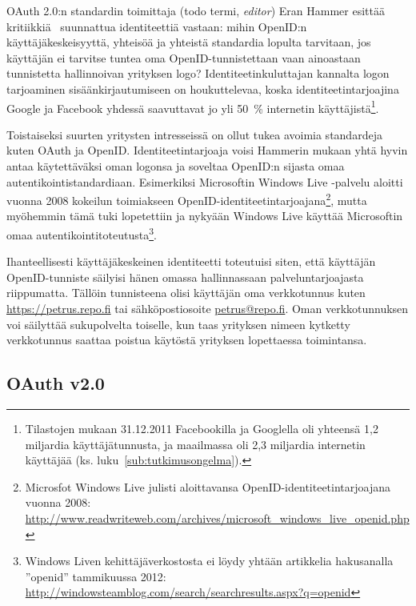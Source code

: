 \documentclass[finnish,gradu]{tktltiki}
\begin{document}
    OAuth 2.0:n standardin toimittaja (todo termi, \emph{editor}) Eran Hammer esittää kritiikkiä~\cite{hueniverse_openid_crisis} suunnattua identiteettiä vastaan: mihin OpenID:n käyttäjäkeskeisyyttä, yhteisöä ja yhteistä standardia lopulta tarvitaan, jos käyttäjän ei tarvitse tuntea oma OpenID-tunnistettaan vaan ainoastaan tunnistetta hallinnoivan yrityksen logo? Identiteetinkuluttajan kannalta logon tarjoaminen sisäänkirjautumiseen on houkuttelevaa, koska identiteetintarjoajina Google ja Facebook yhdessä saavuttavat jo yli 50~\% internetin käyttäjistä\footnote{Tilastojen mukaan 31.12.2011 Facebookilla ja Googlella oli yhteensä 1,2 miljardia käyttäjätunnusta, ja maailmassa oli 2,3 miljardia internetin käyttäjää (ks. luku~\ref{sub:tutkimusongelma}).}.

    Toistaiseksi suurten yritysten intresseissä on ollut tukea avoimia standardeja kuten OAuth ja OpenID. Identiteetintarjoaja voisi Hammerin mukaan yhtä hyvin antaa käytettäväksi oman logonsa ja soveltaa OpenID:n sijasta omaa autentikointistandardiaan. Esimerkiksi Microsoftin Windows Live -palvelu aloitti vuonna 2008  kokeilun toimiakseen OpenID-identiteetintarjoajana\footnote{Microsfot Windows Live julisti aloittavansa OpenID-identiteetintarjoajana vuonna 2008: \\ \url{http://www.readwriteweb.com/archives/microsoft_windows_live_openid.php}},
  mutta myöhemmin tämä tuki lopetettiin ja nykyään Windows Live käyttää Microsoftin omaa autentikointitoteutusta\footnote{Windows Liven kehittäjäverkostosta ei löydy yhtään artikkelia hakusanalla ''openid'' tammikuussa 2012: \url{http://windowsteamblog.com/search/searchresults.aspx?q=openid}}.

  Ihanteellisesti käyttäjäkeskeinen identiteetti toteutuisi siten, että käyttäjän OpenID-tunniste säilyisi hänen omassa hallinnassaan palveluntarjoajasta riippumatta. Tällöin tunnisteena olisi käyttäjän oma verkkotunnus kuten \url{https://petrus.repo.fi} tai sähköpostiosoite \url{petrus@repo.fi}. Oman verkkotunnuksen voi säilyttää sukupolvelta toiselle, kun taas yrityksen nimeen kytketty verkkotunnus saattaa poistua käytöstä yrityksen lopettaessa toimintansa.





  \subsection{OAuth v2.0} %
  \label{sub:oauth}
\end{document}
